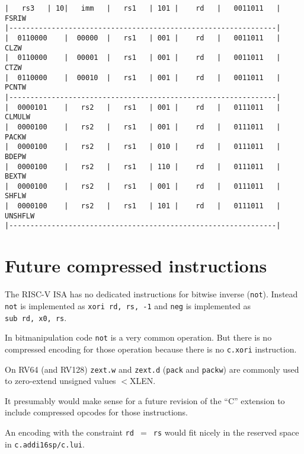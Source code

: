 \begin{minipage}{\linewidth}
\begin{verbatim}
|   rs3   | 10|   imm   |   rs1   | 101 |    rd   |   0011011   |  FSRIW
|---------------------------------------------------------------|
|  0110000    |  00000  |   rs1   | 001 |    rd   |   0011011   |  CLZW
|  0110000    |  00001  |   rs1   | 001 |    rd   |   0011011   |  CTZW
|  0110000    |  00010  |   rs1   | 001 |    rd   |   0011011   |  PCNTW
|---------------------------------------------------------------|
|  0000101    |   rs2   |   rs1   | 001 |    rd   |   0111011   |  CLMULW
|  0000100    |   rs2   |   rs1   | 001 |    rd   |   0111011   |  PACKW
|  0000100    |   rs2   |   rs1   | 010 |    rd   |   0111011   |  BDEPW
|  0000100    |   rs2   |   rs1   | 110 |    rd   |   0111011   |  BEXTW
|  0000100    |   rs2   |   rs1   | 001 |    rd   |   0111011   |  SHFLW
|  0000100    |   rs2   |   rs1   | 101 |    rd   |   0111011   |  UNSHFLW
|---------------------------------------------------------------|
\end{verbatim}
\end{minipage}


\section{Future compressed instructions}

The RISC-V ISA has no dedicated instructions for bitwise inverse (\texttt{not}).
Instead \texttt{not} is implemented as \texttt{xori\ rd,\ rs,\ -1} and
\texttt{neg} is implemented as \texttt{sub\ rd,\ x0,\ rs}.

In bitmanipulation code \texttt{not} is a very common operation. But there is
no compressed encoding for those operation because there is no \texttt{c.xori}
instruction.

On RV64 (and RV128) {\tt zext.w} and {\tt zext.d} ({\tt pack} and {\tt packw})
are commonly used to zero-extend unsigned values $<$XLEN.

It presumably would make sense for a future revision of the ``C'' extension to
include compressed opcodes for those instructions.

An encoding with the constraint \texttt{rd $=$ rs} would fit nicely in the
reserved space in \texttt{c.addi16sp/c.lui}.

